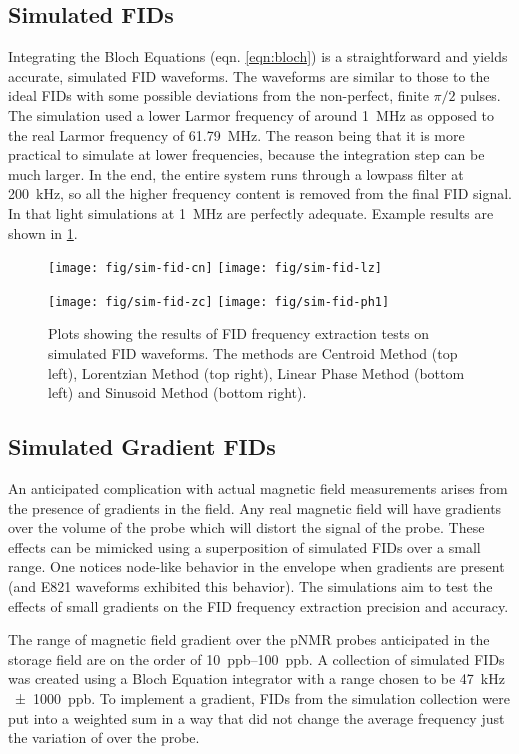 \subsection{Simulated FIDs}
Integrating the Bloch Equations (eqn. \ref{eqn:bloch}) is a straightforward and yields accurate, simulated FID waveforms.  The waveforms are similar to those to the ideal FIDs with some possible deviations from the non-perfect, finite $\pi/2$ pulses.  The simulation used a lower Larmor frequency of around \SI{1}{\MHz} as opposed to the real Larmor frequency of \SI{61.79}{\MHz}.  The reason being that it is more practical to simulate at lower frequencies, because the integration step can be much larger.  In the end, the entire system runs through a lowpass filter at \SI{200}{\kHz}, so all the higher frequency content is removed from the final FID signal.  In that light simulations at \SI{1}{\MHz} are perfectly adequate.  Example results are shown in \ref{fig:fid-sim-freq-extraction}.

\begin{figure}
\label{fig:fid-sim-freq-extraction}
\centering
\texttt{[image: fig/sim-fid-cn]}
\texttt{[image: fig/sim-fid-lz]}

\texttt{[image: fig/sim-fid-zc]}
\texttt{[image: fig/sim-fid-ph1]}

\caption{Plots showing the results of FID frequency extraction tests on simulated FID waveforms.  The methods are Centroid Method (top left), Lorentzian Method (top right), Linear Phase Method (bottom left) and Sinusoid Method (bottom right).  
}
\end{figure}

\subsection{Simulated Gradient FIDs}
An anticipated complication with actual magnetic field measurements arises from the presence of gradients in the field.  Any real magnetic field will have gradients over the volume of the probe which will distort the signal of the probe.  These effects can be mimicked using a superposition of simulated FIDs over a small range.  One notices node-like behavior in the envelope when gradients are present (and E821 waveforms exhibited this behavior).  The simulations aim to test the effects of small gradients on the FID frequency extraction precision and accuracy.

The range of magnetic field gradient over the pNMR probes anticipated in the \gmtwo storage field are on the order of \SIrange{10}{100}{ppb}. A collection of simulated FIDs was created using a Bloch Equation integrator with a range chosen to be \SI{47}{\kHz} \SI{\pm 1000}{ppb}. To implement a gradient, FIDs from the simulation collection were put into a weighted sum in a way that did not change the average frequency just the variation of over the probe.

